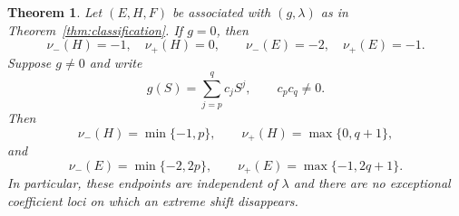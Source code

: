 \documentclass[11pt,reqno]{amsart}
\numberwithin{equation}{section}
\newtheorem{theorem}{Theorem}[section]
\theoremstyle{definition}
\theoremstyle{remark}
\begin{document}
\begin{theorem}\label{thm:support}
Let $(E,H,F)$ be associated with $(g,\lambda)$ as in Theorem~\ref{thm:classification}.  If $g=0$, then
\[
 \nu_-(H)=-1,
 \quad \nu_+(H)=0,
 \qquad
 \nu_-(E)=-2,
 \quad \nu_+(E)=-1.
\]
Suppose $g\ne0$ and write
\begin{equation}\label{eq:g-pq}
 g(S)=\sum_{j=p}^{q}c_jS^j,
 \qquad
 c_pc_q\ne0.
\end{equation}
Then
\begin{equation}\label{eq:H-endpoints}
 \nu_-(H)=\min\{-1,p\},
 \qquad
 \nu_+(H)=\max\{0,q+1\},
\end{equation}
and
\begin{equation}\label{eq:E-endpoints}
 \nu_-(E)=\min\{-2,2p\},
 \qquad
 \nu_+(E)=\max\{-1,2q+1\}.
\end{equation}
In particular, these endpoints are independent of $\lambda$ and there are no exceptional coefficient loci on which an extreme shift disappears.
\end{theorem}
\end{document}

